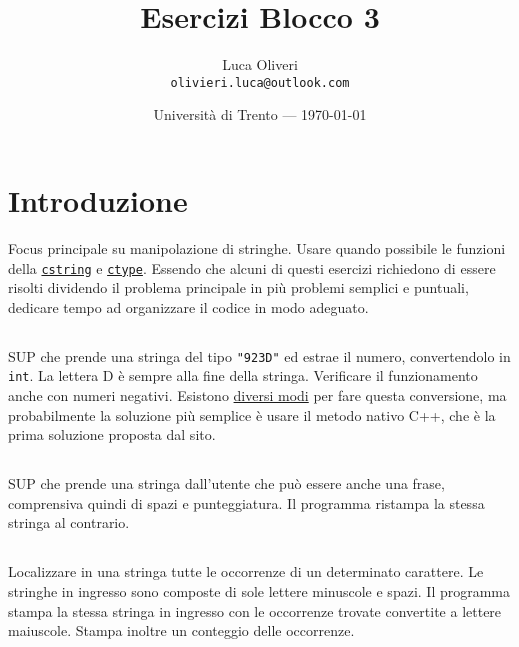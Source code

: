 \documentclass{article}
\title{Esercizi Blocco 3} %
\author{Luca Oliveri\\ \texttt{olivieri.luca@outlook.com}} %
\date{Università di Trento --- \today} %
\begin{document}
\maketitle %

\section*{Introduzione} %

\setcounter{section}{3}
Focus principale su manipolazione di stringhe. Usare quando possibile le funzioni della \href{http://www.cplusplus.com/reference/cstring/}{\texttt{cstring}} e \href{http://www.cplusplus.com/reference/cctype/}{\texttt{ctype}}. Essendo che alcuni di questi esercizi richiedono di essere risolti dividendo il problema principale in più problemi semplici e puntuali, dedicare tempo ad organizzare il codice in modo adeguato.


\subsection{}
SUP che prende una stringa del tipo \texttt{"923D"} ed estrae il numero, convertendolo in \texttt{int}. La lettera D è sempre alla fine della stringa. Verificare il funzionamento anche con numeri negativi. Esistono \href{https://www.geeksforgeeks.org/converting-strings-numbers-cc/}{diversi modi} per fare questa conversione, ma probabilmente la soluzione più semplice è usare il metodo nativo C++, che è la prima soluzione proposta dal sito.

\subsection{}
SUP che prende una stringa dall'utente che può essere anche una frase, comprensiva quindi di spazi e punteggiatura. Il programma ristampa la stessa stringa al contrario.  

\subsection{}
Localizzare in una stringa tutte le occorrenze di un determinato carattere. Le stringhe in ingresso sono composte di sole lettere minuscole e spazi. Il programma stampa la stessa stringa in ingresso con le occorrenze trovate convertite a lettere maiuscole. Stampa inoltre un conteggio delle occorrenze.
\end{document}
